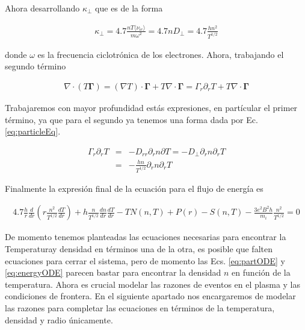 Ahora desarrollando $\kappa_\perp$ que es de la forma \cite{helander2005}

\begin{eqnarray} 
  \kappa_\perp = 4.7\frac{nT\langle \nu_{ie} \rangle}{m\omega^2} = 4.7n D_\perp = 4.7\frac{hn^2}{T^{1/2}}
\end{eqnarray}

donde $\omega$ es la frecuencia ciclotr\'onica de los electrones. Ahora, trabajando el segundo t\'ermino

\begin{eqnarray}
  \nabla\cdot(T\pmb{\Gamma}) = (\nabla T) \cdot \pmb{\Gamma} + T\nabla\cdot\pmb{\Gamma} = \Gamma_r\partial_r T + T\nabla\cdot{\pmb{\Gamma}}
\end{eqnarray}

Trabajaremos con mayor profundidad est\'as expresiones, en part\'icular el primer t\'ermino, ya que para el segundo ya tenemos una forma dada por Ec. \eqref{eq:particleEq}. 

\begin{eqnarray}
  \Gamma_r\partial_rT &=& -D_{rr}\partial_r n \partial T= -D_\perp\partial_r n\partial_r T \nonumber\\
                            &=& -\frac{hn}{T^{1/2}}\partial_r n \partial_r T
\end{eqnarray}

Finalmente la expresi\'on final de la ecuaci\'on para el flujo de energ\'ia es

\begin{eqnarray}\label{eq:energyODE}
	4.7\frac{h}{r}\frac{d}{dr}\left(r\frac{n^2}{T^{1/2}}\frac{dT}{dr}\right) + h\frac{n}{T^{1/2}}\frac{dn}{dr}\frac{dT}{dr}  - TN(n,T) + P(r) - S(n, T) - \frac{3e^2B^2 h}{m_i}\frac{n^2}{T^{1/2}}= 0
\end{eqnarray}

De momento tenemos planteadas las ecuaciones necesarias para encontrar la Temperaturay densidad en t\'erminos una de la otra, es posible que falten ecuaciones para cerrar el sistema, pero de momento las Ecs. \eqref{eq:partODE} y \eqref{eq:energyODE} parecen bastar para encontrar la densidad $n$ en funci\'on de la temperatura. Ahora es crucial modelar las razones de eventos en el plasma y las condiciones de frontera. En el siguiente apartado nos encargaremos de modelar las razones para completar las ecuaciones en t\'erminos de la temperatura, densidad y radio \'unicamente.
